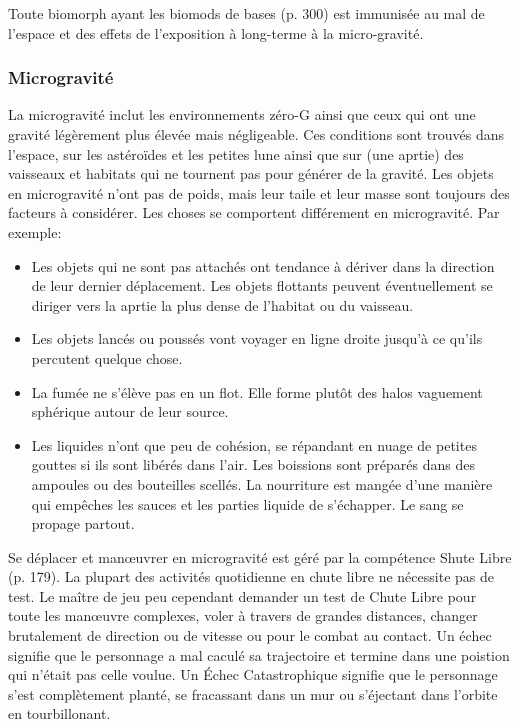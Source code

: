 Toute biomorph ayant les biomods de bases (p. 300) est immunisée au mal de l'espace et des effets de l'exposition à long-terme à la micro-gravité. 

\subsubsection{Microgravité} 

La microgravité inclut les environnements zéro-G ainsi que ceux qui ont une gravité légèrement plus élevée mais négligeable. Ces conditions sont trouvés dans l'espace, sur les astéroïdes et les petites lune ainsi que sur (une aprtie) des vaisseaux et habitats qui ne tournent pas pour générer de la gravité. Les objets en microgravité n'ont pas de poids, mais leur taile et leur masse sont toujours des facteurs à considérer. Les choses se comportent différement en microgravité. Par exemple: 

\begin{itemize} \item Les objets qui ne sont pas attachés ont tendance à dériver dans la direction de leur dernier déplacement. Les objets flottants peuvent éventuellement se diriger vers la aprtie la plus dense de l'habitat ou du vaisseau. \item Les objets lancés ou poussés vont voyager en ligne droite jusqu'à ce qu'ils percutent quelque chose. \item La fumée ne s'élève pas en un flot. Elle forme plutôt des halos vaguement sphérique autour de leur source. \item Les liquides n'ont que peu de cohésion, se répandant en nuage de petites gouttes si ils sont libérés dans l'air. Les boissions sont préparés dans des ampoules ou des bouteilles scellés. La nourriture est mangée d'une manière qui empêches les sauces et les parties liquide de s'échapper. Le sang se propage partout. \end{itemize} 

Se déplacer et manœuvrer en microgravité est géré par la compétence Shute Libre (p. 179). La plupart des activités quotidienne en chute libre ne nécessite pas de test. Le maître de jeu peu cependant demander un test de Chute Libre pour toute les manœuvre complexes, voler à travers de grandes distances, changer brutalement de direction ou de vitesse ou pour le combat au contact. Un échec signifie que le personnage a mal caculé sa trajectoire et termine dans une poistion qui n'était pas celle voulue. Un Échec Catastrophique signifie que le personnage s'est complètement planté, se fracassant dans un mur ou s'éjectant dans l'orbite en tourbillonant. 

